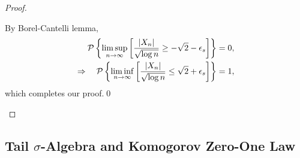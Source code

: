 \documentclass[11pt]{article}
\begin{document}
\begin{itemize}
\begin{proof}
\begin{enumerate}
By Borel-Cantelli lemma, 
\begin{align*}
{\mathcal P}\left\{\limsup\limits_{n\rightarrow \infty}\left[\frac{\left\lvert X_{n} \right\rvert}{\sqrt{\log n}}\ge  -\sqrt{2}-\epsilon_{s}\right]\right\} &= 0,\\
\Rightarrow \quad {\mathcal P}\left\{\liminf\limits_{n\rightarrow \infty}\left[\frac{\left\lvert X_{n} \right\rvert}{\sqrt{\log n}}\le  \sqrt{2}+\epsilon_{s}\right]\right\} &= 1,
\end{align*} which completes our proof.\qed
\end{enumerate}
\end{proof} 
\end{itemize}

\subsection{Tail $\sigma$-Algebra and Komogorov Zero-One Law}
\end{document}
